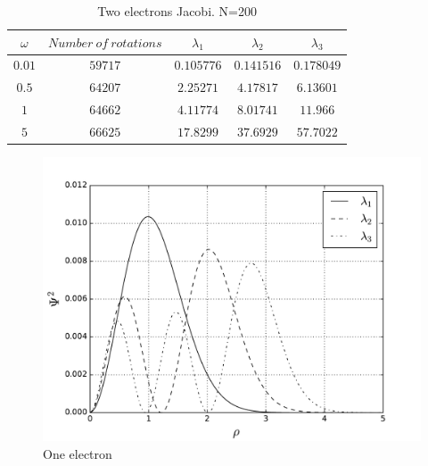 \documentclass[10pt]{article}
\begin{document}
\begin{table}
  \caption{Two electrons Jacobi. N=200}
  \label{tab:two}
	\begin{center}
    \begin{tabular}{c|c|c|c|c}
    \hline
		$\omega$ & $Number\ of\ rotations$ & $\lambda_1$ & $\lambda_2$ & $\lambda_3$ \\
        \hline
		$0.01$ & $59717$ & $0.105776$ & $0.141516$  & $0.178049$ \\ 
		$0.5$  & $64207$ & $2.25271 $ & $4.17817 $  & $6.13601$ \\ 
		$1  $  & $64662$ & $4.11774 $ & $8.01741 $  & $11.966$ \\
		$5  $  & $66625$ & $17.8299 $ & $37.6929 $  & $57.7022$ \\

	\end{tabular}
  \end{center}
\end{table}


\begin{figure}
  \begin{center}
    \includegraphics[scale=0.7]{one_electron}
    \caption{One electron}
    \label{fig:one_electron}
  \end{center}
\end{figure}
\end{document}

